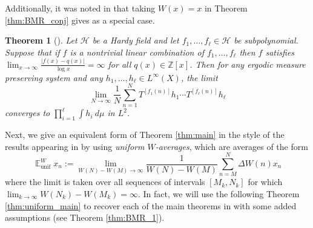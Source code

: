 \documentclass[12pt]{article}
\theoremstyle{plain} %
\newtheorem{theorem}{Theorem}[section]
\theoremstyle{definition} %
\theoremstyle{plain}
\theoremstyle{plain}
\numberwithin{equation}{section}
\newcommand{\Z}{\mathbb{Z}}
\newcommand{\1}{\mathbbm{1}}
\newcommand{\E}{\operatorname{\mathbb{E}}}
\newcommand{\oo}{\infty}
\newcommand{\round}[1]{[ #1 ]}
\begin{document}
Additionally, it was noted in \cite{BMR24} that taking $W(x)=x$ in Theorem \ref{thm:BMR_conj} gives \cite[Theorem 1.12]{TSINAS2023a} as a special case.
\begin{theorem}[{\cite[Theorem 1.12]{TSINAS2023a}}]
    Let $\mathcal{H}$ be a Hardy field and let $f_1,\dots, f_{\ell}\in \mathcal{H}$ be subpolynomial. Suppose that if $f$ is a nontrivial linear combination of $f_1,\dots, f_{\ell}$ then $f$ satisfies $\lim_{x\to\oo}\frac{|f(x)-q(x)|}{\log x}=\oo$ for all $q(x)\in \Z[x]$. Then for any ergodic measure preserving system and any $h_1,\dots, h_{\ell}\in L^{\oo}(X)$, the limit
    \[
    \lim_{N\to\oo}\frac{1}{N}\sum_{n=1}^N T^{\round {f_1(n)}}h_1\cdots T^{\round {f_{\ell}(n)}}h_{\ell}
    \] 
    converges to $\prod_{i=1}^{\ell}\int h_i~d\mu$ in $L^2$.
\end{theorem}

Next, we give an equivalent form of Theorem \ref{thm:main} in the style of the results appearing in \cite{Bergelson_Moreira_Richter_2020} by using \emph{uniform $W$-averages}, which are averages of the form 
\begin{equation} 
\E_{\text{unif}}^Wx_n:=\lim_{W(N)-W(M)\to\oo}\frac{1}{W(N)-W(M)}\sum_{n=M}^N\Delta W(n)x_n
\end{equation}
where the limit is taken over all sequences of intervals $[M_k,N_k]$ for which $\lim_{k\to\oo}W(N_k)-W(M_k)=\oo$. In fact, we will use the following Theorem \ref{thm:uniform_main} to recover each of the main theorems in \cite{Bergelson_Moreira_Richter_2020} with some added assumptions (see Theorem \ref{thm:BMR_1}).
\end{document}
